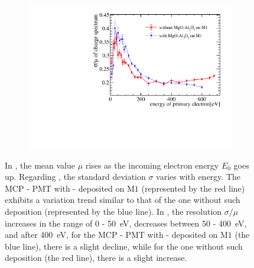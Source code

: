 \begin{figure}[!ht]
\begin{subfigure}[b]{0.45\textwidth}
		\includegraphics[width=\textwidth]{PMTRelated/GTmodel/gain_sigmamu.pdf}
		\caption{}
		\label{fig:sigmamu}
	\end{subfigure}
	\caption{In , the mean value \(\mu\) rises as the incoming electron energy \(E_0\) goes up. Regarding , the standard deviation \(\sigma\) varies with energy. The MCP - PMT with - deposited on \(\mathrm{M}1\) (represented by the red line) exhibits a variation trend similar to that of the one without such deposition (represented by the blue line). In , the resolution \(\sigma/\mu\) increases in the range of 0 - \SI{50}{eV}, decreases between 50 - \SI{400}{eV}, and after \SI{400}{eV}, for the MCP - PMT with - deposited on \(\mathrm{M}1\) (the blue line), there is a slight decline, while for the one without such deposition (the red line), there is a slight increase.
	}
	\label{fig:gaintest}
\end{figure}

